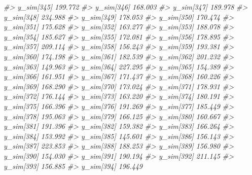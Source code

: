 \documentclass[
  10pt,
  italian,
  a4paper,
  extrafontsizes,onecolumn,openright
  ]{memoir}
\newenvironment{Shaded}{\begin{snugshade}}{\end{snugshade}}
\newcommand{\CommentTok}[1]{\textcolor[rgb]{0.56,0.35,0.01}{\textit{#1}}}
\begin{document}
\begin{Shaded}
\begin{Highlighting}[]
\CommentTok{\#\textgreater{}   y\_sim[345] 199.772}
\CommentTok{\#\textgreater{}   y\_sim[346] 168.003}
\CommentTok{\#\textgreater{}   y\_sim[347] 189.978}
\CommentTok{\#\textgreater{}   y\_sim[348] 234.988}
\CommentTok{\#\textgreater{}   y\_sim[349] 178.053}
\CommentTok{\#\textgreater{}   y\_sim[350] 170.474}
\CommentTok{\#\textgreater{}   y\_sim[351] 175.628}
\CommentTok{\#\textgreater{}   y\_sim[352] 163.277}
\CommentTok{\#\textgreater{}   y\_sim[353] 188.078}
\CommentTok{\#\textgreater{}   y\_sim[354] 185.627}
\CommentTok{\#\textgreater{}   y\_sim[355] 172.081}
\CommentTok{\#\textgreater{}   y\_sim[356] 178.895}
\CommentTok{\#\textgreater{}   y\_sim[357] 209.114}
\CommentTok{\#\textgreater{}   y\_sim[358] 156.243}
\CommentTok{\#\textgreater{}   y\_sim[359] 193.381}
\CommentTok{\#\textgreater{}   y\_sim[360] 174.198}
\CommentTok{\#\textgreater{}   y\_sim[361] 182.539}
\CommentTok{\#\textgreater{}   y\_sim[362] 201.232}
\CommentTok{\#\textgreater{}   y\_sim[363] 149.963}
\CommentTok{\#\textgreater{}   y\_sim[364] 227.295}
\CommentTok{\#\textgreater{}   y\_sim[365] 154.389}
\CommentTok{\#\textgreater{}   y\_sim[366] 161.951}
\CommentTok{\#\textgreater{}   y\_sim[367] 171.437}
\CommentTok{\#\textgreater{}   y\_sim[368] 160.226}
\CommentTok{\#\textgreater{}   y\_sim[369] 168.290}
\CommentTok{\#\textgreater{}   y\_sim[370] 173.024}
\CommentTok{\#\textgreater{}   y\_sim[371] 178.931}
\CommentTok{\#\textgreater{}   y\_sim[372] 176.144}
\CommentTok{\#\textgreater{}   y\_sim[373] 163.220}
\CommentTok{\#\textgreater{}   y\_sim[374] 180.191}
\CommentTok{\#\textgreater{}   y\_sim[375] 166.396}
\CommentTok{\#\textgreater{}   y\_sim[376] 191.269}
\CommentTok{\#\textgreater{}   y\_sim[377] 185.449}
\CommentTok{\#\textgreater{}   y\_sim[378] 195.063}
\CommentTok{\#\textgreater{}   y\_sim[379] 166.125}
\CommentTok{\#\textgreater{}   y\_sim[380] 160.667}
\CommentTok{\#\textgreater{}   y\_sim[381] 191.396}
\CommentTok{\#\textgreater{}   y\_sim[382] 159.382}
\CommentTok{\#\textgreater{}   y\_sim[383] 166.264}
\CommentTok{\#\textgreater{}   y\_sim[384] 153.992}
\CommentTok{\#\textgreater{}   y\_sim[385] 145.601}
\CommentTok{\#\textgreater{}   y\_sim[386] 156.143}
\CommentTok{\#\textgreater{}   y\_sim[387] 223.853}
\CommentTok{\#\textgreater{}   y\_sim[388] 188.253}
\CommentTok{\#\textgreater{}   y\_sim[389] 156.980}
\CommentTok{\#\textgreater{}   y\_sim[390] 154.030}
\CommentTok{\#\textgreater{}   y\_sim[391] 190.194}
\CommentTok{\#\textgreater{}   y\_sim[392] 211.145}
\CommentTok{\#\textgreater{}   y\_sim[393] 156.885}
\CommentTok{\#\textgreater{}   y\_sim[394] 196.449}

\end{Highlighting}
\end{Shaded}
\end{document}
